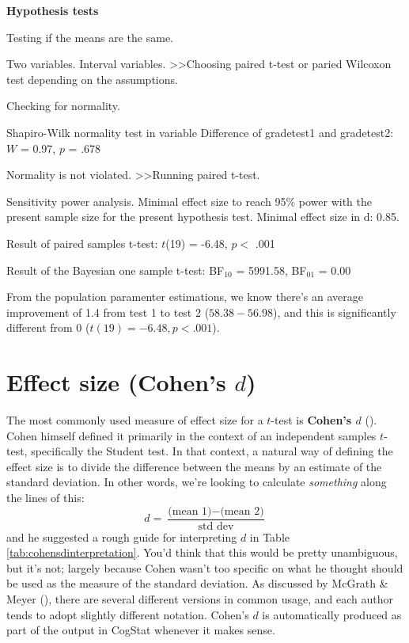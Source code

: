 \documentclass[
  11pt,
  a4paper,
  twoside,symmetric,openright]{book}
\theoremstyle{break}
\theoremstyle{break}
\begin{document}
\begin{tcolorbox}[colback=white,
  colframe=lightgray,
  coltext=black,
  boxsep=4pt,
  boxrule=0.3pt,
  arc=0pt]
  {   \sffamily
      \color{CSblue}\textbf{Hypothesis tests}
      
      \color{CSgreen}Testing if the means are the same.
      
      Two variables. Interval variables.  \textgreater\textgreater  Choosing paired t-test or paried Wilcoxon test depending on the assumptions.

      Checking for normality.

      \color{black}
      Shapiro-Wilk normality test in variable Difference of grade\textunderscore test1 and grade\textunderscore test2: $W$ = 0.97, $p$ = .678

      \color{CSgreen}
      Normality is not violated. \textgreater\textgreater Running paired t-test.

      \color{black}
      Sensitivity power analysis. Minimal effect size to reach 95\% power with the present sample size for the present hypothesis test. Minimal effect size in d: 0.85.
      
      Result of paired samples t-test: $t$(19) = -6.48, $p <$ .001

      Result of the Bayesian one sample t-test: BF$_{10}$ = 5991.58, BF$_{01}$ = 0.00
      \normalfont
  }
\end{tcolorbox}

From the population paramenter estimations, we know there's an average improvement of 1.4 from test 1 to test 2 (\(58.38 - 56.98\)), and this is significantly different from 0 (\(t(19)=-6.48, p<.001\)).

\section{\texorpdfstring{Effect size (Cohen's \(d\))}{Effect size (Cohen's d)}}\label{cohensd}

The most commonly used measure of effect size for a \(t\)-test is \textbf{Cohen's \(d\)} (). Cohen himself defined it primarily in the context of an independent samples \(t\)-test, specifically the Student test. In that context, a natural way of defining the effect size is to divide the difference between the means by an estimate of the standard deviation. In other words, we're looking to calculate \emph{something} along the lines of this:
\[
d = \frac{\mbox{(mean 1)} - \mbox{(mean 2)}}{\mbox{std dev}}
\]
and he suggested a rough guide for interpreting \(d\) in Table \ref{tab:cohensdinterpretation}. You'd think that this would be pretty unambiguous, but it's not; largely because Cohen wasn't too specific on what he thought should be used as the measure of the standard deviation. As discussed by McGrath \& Meyer (), there are several different versions in common usage, and each author tends to adopt slightly different notation. Cohen's \(d\) is automatically produced as part of the output in CogStat whenever it makes sense.
\end{document}

